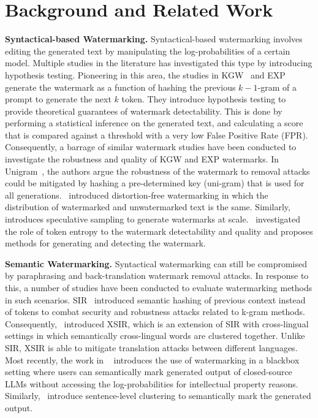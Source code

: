 \section{Background and Related Work}
\textbf{Syntactical-based Watermarking.} Syntactical-based watermarking involves editing the generated text by manipulating the log-probabilities of a certain model. Multiple studies in the literature has investigated this type by introducing hypothesis testing. Pioneering in this area, the studies in KGW~\citep{kirchenbauer2023watermark, kirchenbauer2023reliability} and EXP~\citep{aaronson_my_2022} generate the watermark as a function of hashing the previous $k-1$-gram of a prompt to generate the next $k$ token. They introduce hypothesis testing to provide theoretical guarantees of watermark detectability. This is done by performing a statistical inference on the generated text, and calculating a score that is compared against a threshold with a very low False Positive Rate (FPR). Consequently, a barrage of similar watermark studies have been conducted to investigate the robustness and quality of KGW and EXP watermarks. In Unigram~\citet{zhao2023provable}, the authors argue the robustness of the watermark to removal attacks could be mitigated by hashing a pre-determined key (uni-gram) that is used for all generations.~\citet{kuditipudi2023robust, christ2024undetectable} introduced distortion-free watermarking in which the distribution of watermarked and unwatermarked text is the same. Similarly,~\citet{dathathri2024scalable} introduces speculative sampling to generate watermarks at scale.~\citet{lu2024entropy, lee2023wrote} investigated the role of token entropy to the watermark detectability and quality and proposes methods for generating and detecting the watermark. 

\noindent\textbf{Semantic Watermarking.} Syntactical watermarking can still be compromised by paraphrasing and back-translation watermark removal attacks. In response to this, a number of studies have been conducted to evaluate watermarking methods in such scenarios. SIR~\citep{liu2024a} introduced semantic hashing of previous context instead of tokens to combat security and robustness attacks related to k-gram methods. Consequently,~\citet{he2024can} introduced XSIR, which is an extension of SIR with cross-lingual settings in which semantically cross-lingual words are clustered together. Unlike SIR, XSIR is able to mitigate translation attacks between different languages. Most recently, the work in ~\citet{chang2024postmark} introduces the use of watermarking in a blackbox setting where users can semantically mark generated output of closed-source LLMs without accessing the log-probabilities for intellectual property reasons. Similarly,~\citet{hou2023semstamp, hou2024k} introduce sentence-level clustering to semantically mark the generated output.


